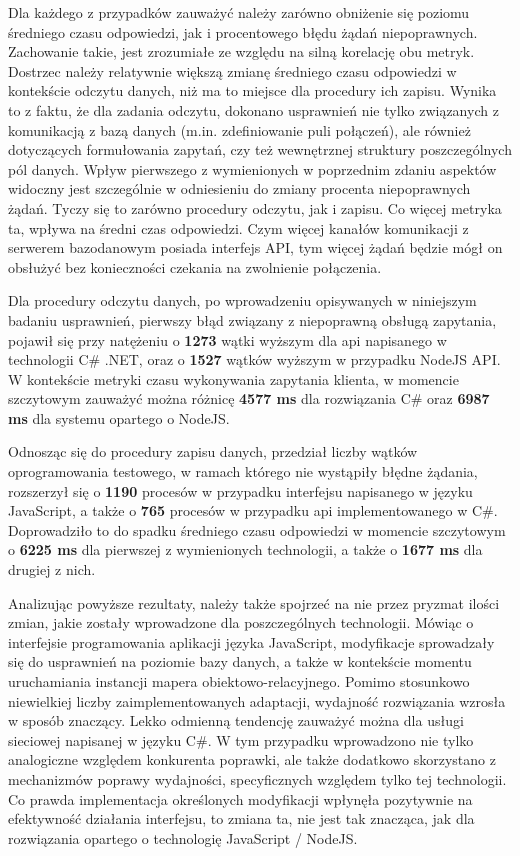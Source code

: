 Dla każdego z przypadków zauważyć należy zarówno obniżenie się poziomu średniego czasu odpowiedzi, jak i procentowego błędu żądań niepoprawnych. Zachowanie takie, jest zrozumiałe ze względu na silną korelację obu metryk. Dostrzec należy relatywnie większą zmianę średniego czasu odpowiedzi w kontekście odczytu danych, niż ma to miejsce dla procedury ich zapisu. Wynika to z faktu, że dla zadania odczytu, dokonano usprawnień nie tylko związanych z komunikacją z bazą danych (m.in. zdefiniowanie puli połączeń), ale również dotyczących formułowania zapytań, czy też wewnętrznej struktury poszczególnych pól danych. Wpływ pierwszego z wymienionych w poprzednim zdaniu aspektów widoczny jest szczególnie w odniesieniu do zmiany procenta niepoprawnych żądań. Tyczy się to zarówno procedury odczytu, jak i zapisu. Co więcej metryka ta, wpływa na średni czas odpowiedzi. Czym więcej kanałów komunikacji z serwerem bazodanowym posiada interfejs API, tym więcej żądań będzie mógł on obsłużyć bez konieczności czekania na zwolnienie połączenia.

Dla procedury odczytu danych, po wprowadzeniu opisywanych w niniejszym badaniu usprawnień, pierwszy błąd związany z niepoprawną obsługą zapytania, pojawił się przy natężeniu o \textbf{1273} wątki wyższym dla api napisanego w technologii C\# .NET, oraz o \textbf{1527} wątków wyższym w przypadku NodeJS API. W kontekście metryki czasu wykonywania zapytania klienta, w momencie szczytowym zauważyć można różnicę \textbf{4577 ms} dla rozwiązania C\# oraz \textbf{6987 ms} dla systemu opartego o NodeJS.

Odnosząc się do procedury zapisu danych, przedział liczby wątków oprogramowania testowego, w ramach którego nie wystąpiły błędne żądania, rozszerzył się o \textbf{1190} procesów w przypadku interfejsu napisanego w języku JavaScript, a także o \textbf{765} procesów w przypadku api implementowanego w C\#. Doprowadziło to do spadku średniego czasu odpowiedzi w momencie szczytowym o \textbf{6225 ms} dla pierwszej z wymienionych technologii, a także o \textbf{1677 ms} dla drugiej z nich.

Analizując powyższe rezultaty, należy także spojrzeć na nie przez pryzmat ilości zmian, jakie zostały wprowadzone dla poszczególnych technologii. Mówiąc o interfejsie programowania aplikacji języka JavaScript, modyfikacje sprowadzały się do usprawnień na poziomie bazy danych, a także w kontekście momentu uruchamiania instancji mapera obiektowo-relacyjnego. Pomimo stosunkowo niewielkiej liczby zaimplementowanych adaptacji, wydajność rozwiązania wzrosła w sposób znaczący. Lekko odmienną tendencję zauważyć można dla usługi sieciowej napisanej w języku C\#. W tym przypadku wprowadzono nie tylko analogiczne względem konkurenta poprawki, ale także dodatkowo skorzystano z mechanizmów poprawy wydajności, specyficznych względem tylko tej technologii. Co prawda implementacja określonych modyfikacji wpłynęła pozytywnie na efektywność działania interfejsu, to zmiana ta, nie jest tak znacząca, jak dla rozwiązania opartego o technologię JavaScript / NodeJS. 

